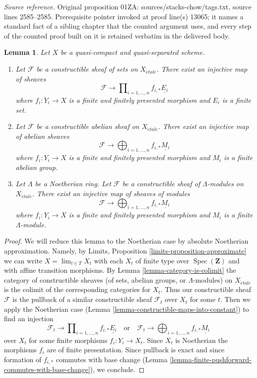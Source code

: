 \documentclass[10pt,a4paper]{amsart}
\newenvironment{reference}{\comment}{\endcomment}
\theoremstyle{plain}
\newtheorem{lemma}[subsection]{Lemma}
\theoremstyle{definition}
\theoremstyle{remark}
\numberwithin{equation}{subsection}
\def\lim{\mathop{\mathrm{lim}}\nolimits}
\def\Spec{\mathop{\mathrm{Spec}}}
\def\etale{{\acute{e}tale}}
\begin{document}
\noindent\textit{Source reference.} Original proposition 01ZA: sources/stacks-chow/tags.txt, source lines 2585--2585. Prerequisite pointer invoked at proof line(s) 13065; it names a standard fact of a sibling chapter that the counted argument uses, and every step of the counted proof built on it is retained verbatim in the delivered body.\par\medskip
\begin{lemma}
\label{lemma-constructible-maps-into-constant-general}
\begin{reference}
\cite[Exposee IX, Proposition 2.14]{SGA4}
\end{reference}
Let $X$ be a quasi-compact and quasi-separated scheme.
\begin{enumerate}
\item Let $\mathcal{F}$ be a constructible sheaf of sets on $X_\etale$.
There exist an injective map of sheaves
$$
\mathcal{F} \longrightarrow
\prod\nolimits_{i = 1, \ldots, n} f_{i, *}\underline{E_i}
$$
where $f_i : Y_i \to X$ is a finite and finitely presented morphism and
$E_i$ is a finite set.
\item Let $\mathcal{F}$ be a constructible abelian sheaf on $X_\etale$.
There exist an injective map of abelian sheaves
$$
\mathcal{F} \longrightarrow
\bigoplus\nolimits_{i = 1, \ldots, n} f_{i, *}\underline{M_i}
$$
where $f_i : Y_i \to X$ is a finite and finitely presented morphism and
$M_i$ is a finite abelian group.
\item Let $\Lambda$ be a Noetherian ring.
Let $\mathcal{F}$ be a constructible sheaf of $\Lambda$-modules on $X_\etale$.
There exist an injective map of sheaves of modules
$$
\mathcal{F} \longrightarrow
\bigoplus\nolimits_{i = 1, \ldots, n} f_{i, *}\underline{M_i}
$$
where $f_i : Y_i \to X$ is a finite and finitely presented morphism and
$M_i$ is a finite $\Lambda$-module.
\end{enumerate}
\end{lemma}

\begin{proof}
We will reduce this lemma to the Noetherian case by absolute Noetherian
approximation. Namely, by
Limits, Proposition \ref{limits-proposition-approximate}
we can write $X = \lim_{t \in T} X_t$ with each $X_t$ of finite type over
$\Spec(\mathbf{Z})$ and with affine transition morphisms. By
Lemma \ref{lemma-category-is-colimit}
the category of constructible sheaves (of sets, abelian groups, or
$\Lambda$-modules) on $X_\etale$ is the colimit of the corresponding
categories for $X_t$. Thus our constructible sheaf $\mathcal{F}$
is the pullback of a similar constructible sheaf $\mathcal{F}_t$
over $X_t$ for some $t$. Then we apply the Noetherian case
(Lemma \ref{lemma-constructible-maps-into-constant})
to find an injection
$$
\mathcal{F}_t \longrightarrow
\prod\nolimits_{i = 1, \ldots, n} f_{i, *}\underline{E_i}
\quad\text{or}\quad
\mathcal{F}_t \longrightarrow
\bigoplus\nolimits_{i = 1, \ldots, n} f_{i, *}\underline{M_i}
$$
over $X_t$ for some finite morphisms $f_i : Y_i \to X_t$.
Since $X_t$ is Noetherian the morphisms $f_i$ are of finite presentation.
Since pullback is exact and since formation of $f_{i, *}$ commutes
with base change
(Lemma \ref{lemma-finite-pushforward-commutes-with-base-change}), we conclude.
\end{proof}
\end{document}
